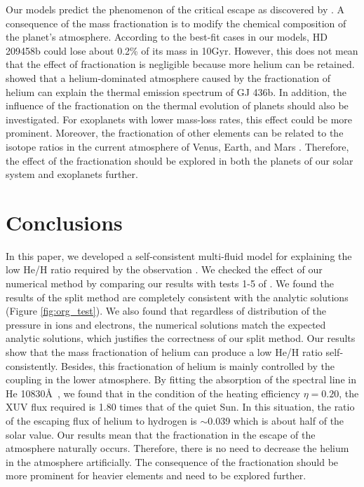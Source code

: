 \documentclass[journal, onecolumn]{aastex631}
\begin{document}
\begin{CJK*}{UTF8}{gbsn}
Our models predict the phenomenon of the critical escape as discovered by \cite{Hunten1987}. A consequence of the mass fractionation is to modify the chemical composition of the planet's atmosphere. According to the best-fit cases in our models, HD 209458b could lose about 0.2\% of its mass in 10Gyr. However, this does not mean that the effect of fractionation is negligible because more helium can be retained. \cite{Hu2015} showed that a helium-dominated atmosphere caused by the fractionation of helium can explain the thermal emission spectrum of GJ 436b. In addition, the influence of the fractionation on the thermal evolution of planets should also be investigated. For exoplanets with lower mass-loss rates, this effect could be more prominent. Moreover, the fractionation of other elements can be related to the isotope ratios in the current atmosphere of Venus, Earth, and Mars \citep{Lammer2020}. Therefore, the effect of the fractionation should be explored in both the planets of our solar system and exoplanets further.




\section{Conclusions}\label{sec:Conclusions}
In this paper, we developed a self-consistent multi-fluid model for explaining the low He/H ratio required by the observation \citep{Lampon2020}. We checked the effect of our numerical method by comparing our results with tests 1-5 of \cite{Toro2009}. We found the results of the split method are completely consistent with the analytic solutions (Figure \ref{fig:org_test}). We also found that regardless of distribution of the pressure in ions and electrons, the numerical solutions match the expected analytic solutions, which justifies the correctness of our split method. Our results show that the mass fractionation of helium can produce a low He/H ratio self-consistently. Besides, this fractionation of helium is mainly controlled by the coupling in the lower atmosphere. By fitting the absorption of the spectral line in He 10830\AA \ , we found that in the condition of the heating efficiency $\eta=0.20$, the XUV flux required is 1.80 times that of the quiet Sun. In this situation, the ratio of the escaping flux of helium to hydrogen is $\sim$0.039 which is about half of the solar value. Our results mean that the fractionation in the escape of the atmosphere naturally occurs. Therefore, there is no need to decrease the helium in the atmosphere artificially. The consequence of the fractionation should be more prominent for heavier elements and need to be explored further.





\end{CJK*}
\end{document}
